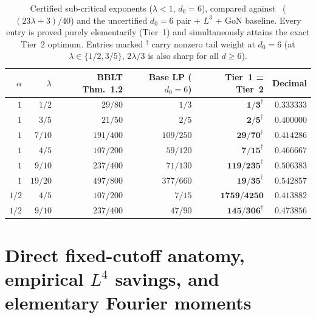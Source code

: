 \documentclass[11pt,a4paper]{amsart}
\theoremstyle{plain}
\theoremstyle{definition}
\theoremstyle{remark}
\begin{document}
\begin{table}[ht]
\centering
\caption{Certified sub-critical exponents ($\lambda < 1$, $d_0=6$), compared against~\cite[Thm.~1.2]{BLT2026} ($(23\lambda+3)/40$) and the uncertified $d_0=6$ pair + $L^3$ + \textsf{GoN} baseline. Every entry is proved purely elementarily (Tier~1) and simultaneously attains the exact Tier~2 optimum. Entries marked $^\dagger$ carry nonzero tail weight at $d_0 = 6$ (at $\lambda \in \{1/2, 3/5\}$, $2\lambda/3$ is also sharp for all $d \ge 6$).}
\label{tab:subcritical}
\footnotesize
\setlength{\tabcolsep}{4pt}
\begin{tabular}{@{}rrrrrr@{}}
\toprule
$\alpha$ & $\lambda$ & BBLT Thm.~1.2 & Base LP ($d_0=6$) & \textbf{Tier~1 = Tier~2} & Decimal \\
\midrule
$1$   & $1/2$   & $29/80$  & $1/3$     & $\mathbf{1/3}^\dagger$      & $0.333333$ \\
$1$   & $3/5$   & $21/50$  & $2/5$     & $\mathbf{2/5}^\dagger$      & $0.400000$ \\
$1$   & $7/10$  & $191/400$& $109/250$ & $\mathbf{29/70}^\dagger$    & $0.414286$ \\
$1$   & $4/5$   & $107/200$& $59/120$  & $\mathbf{7/15}^\dagger$     & $0.466667$ \\
$1$   & $9/10$  & $237/400$& $71/130$  & $\mathbf{119/235}^\dagger$  & $0.506383$ \\
$1$   & $19/20$ & $497/800$& $377/660$ & $\mathbf{19/35}^\dagger$    & $0.542857$ \\
\midrule
$1/2$ & $4/5$   & $107/200$& $7/15$    & $\mathbf{1759/4250}$        & $0.413882$ \\
$1/2$ & $9/10$  & $237/400$& $47/90$   & $\mathbf{145/306}^\dagger$  & $0.473856$ \\
\bottomrule
\end{tabular}
\end{table}

\section{Direct fixed-cutoff anatomy, empirical \texorpdfstring{$L^4$}{L4} savings, and elementary Fourier moments}\label{sec:anatomy}
\end{document}

